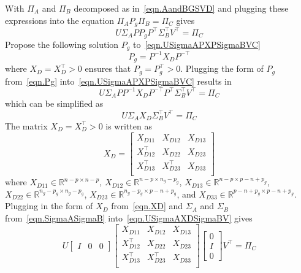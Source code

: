 With $\Pi_{A}$ and $\Pi_{B}$ decomposed as in\ \eqref{eqn.AandBGSVD} and plugging these expressions into the equation $\Pi_{A}P_{g}\Pi_{B}=\Pi_{C}$ gives
\begin{equation}
  \label{eqn.USigmaAPXPSigmaBVC}
  U\Sigma_{A}PP_{g}P^{\top}\Sigma_{B}^{\top}V^{\top} = \Pi_{C}
\end{equation}
Propose the following solution $P_{g}$ to\ \eqref{eqn.USigmaAPXPSigmaBVC}
\begin{equation}
  \label{eqn.Pg}
  P_{g} = P^{-1}X_{D}P^{-\top}
\end{equation}
where $X_{D}=X_{D}^{\top}>0$ ensures that $P_{g}=P_{g}^{\top}>0$.
Plugging the form of $P_{g}$ from\ \eqref{eqn.Pg} into\ \eqref{eqn.USigmaAPXPSigmaBVC} results in
\begin{equation*}
  U\Sigma_{A}PP^{-1}X_{D}P^{-\top} P^{\top}\Sigma_{B}^{\top}V^{\top}
  =
  \Pi_{C}
\end{equation*}
which can be simplified as
\begin{equation}
  \label{eqn.USigmaAXDSigmaBV}
  U\Sigma_{A}X_{D}\Sigma_{B}^{\top}V^{\top} = \Pi_{C}
\end{equation}
The matrix $X_{D}=X_{D}^{\top}>0$ is written as
\begin{equation}
  \label{eqn.XD}
  X_{D} =
  \begin{bmatrix}
    X_{D11} & X_{D12} & X_{D13} \\
    X_{D12}^{\top} & X_{D22} & X_{D23} \\
    X_{D13}^{\top} & X_{D23}^{\top} & X_{D33} \\
  \end{bmatrix}
\end{equation}
where $X_{D11}\in\mathbb{R}^{n-p\times n-p}$, $X_{D12}\in\mathbb{R}^{n-p\times n_{g}-p_{g}}$, $X_{D13}\in\mathbb{R}^{n-p\times p-n+p_{g}}$, $X_{D22}\in\mathbb{R}^{n_{g}-p_{g}\times n_{g}-p_{g}}$, $X_{D23}\in\mathbb{R}^{n_{g}-p_{g}\times p-n+p_{g}}$, and $X_{D33}\in\mathbb{R}^{p-n+p_{g}\times p-n+p_{g}}$.
Plugging in the form of $X_{D}$ from\ \eqref{eqn.XD} and $\Sigma_{A}$ and $\Sigma_{B}$ from\ \eqref{eqn.SigmaASigmaB} into\ \eqref{eqn.USigmaAXDSigmaBV} gives
\begin{equation*}
  U
  \begin{bmatrix}
    I & 0 & 0
  \end{bmatrix}
  \begin{bmatrix}
    X_{D11} & X_{D12} & X_{D13} \\
    X_{D12}^{\top} & X_{D22} & X_{D23} \\
    X_{D13}^{\top} & X_{D23}^{\top} & X_{D33} \\
  \end{bmatrix}
  \begin{bmatrix}
    0 \\
    I \\
    0
  \end{bmatrix}
  V^{\top}
  = \Pi_{C}
\end{equation*}
